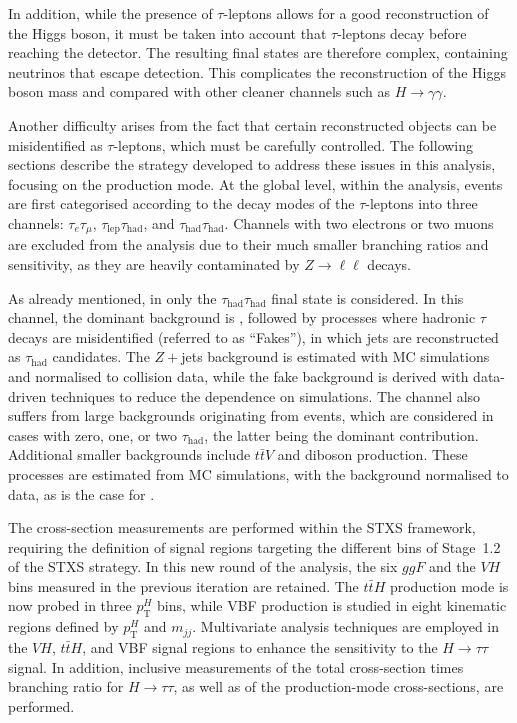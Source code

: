 In addition, while the presence of $\tau$-leptons allows for a good reconstruction of the Higgs boson, it must be taken into account that $\tau$-leptons decay before reaching the detector. The resulting final states are therefore complex, containing neutrinos that escape detection. This complicates the reconstruction of the Higgs boson mass and \pt compared with other cleaner channels such as $H \to \gamma\gamma$.  

Another difficulty arises from the fact that certain reconstructed objects can be misidentified as $\tau$-leptons, which must be carefully controlled. The following sections describe the strategy developed to address these issues in this analysis, focusing on the \ttH production mode. At the global level, within the \htautau analysis, events are first categorised according to the decay modes of the $\tau$-leptons into three channels: $\tau_{e}\tau_{\mu}$, $\tau_{\text{lep}}\tau_{\text{had}}$, and $\tau_{\text{had}}\tau_{\text{had}}$. Channels with two electrons or two muons are excluded from the analysis due to their much smaller branching ratios and sensitivity, as they are heavily contaminated by $Z \to \ell\ell$ decays.  

As already mentioned, in \ttHtt only the $\tau_{\text{had}}\tau_{\text{had}}$ final state is considered. In this channel, the dominant background is \ztautau, followed by processes where hadronic $\tau$ decays are misidentified (referred to as ``Fakes''), in which jets are reconstructed as $\tau_{\text{had}}$ candidates. The $Z+$jets background is estimated with MC simulations and normalised to collision data, while the fake background is derived with data-driven techniques to reduce the dependence on simulations. The \ttH channel also suffers from large backgrounds originating from \ttbar events, which are considered in cases with zero, one, or two $\tau_{\text{had}}$, the latter being the dominant contribution. Additional smaller backgrounds include $t\bar{t}V$ and diboson production. These processes are estimated from MC simulations, with the \ttbar background normalised to data, as is the case for \Ztautau.  

The cross-section measurements are performed within the STXS framework, requiring the definition of signal regions targeting the different bins of Stage~1.2 of the STXS strategy. In this new round of the \htautau analysis, the six $ggF$ and the $VH$ bins measured in the previous iteration are retained. The $t\bar{t}H$ production mode is now probed in three $p_{\text{T}}^H$ bins, while VBF production is studied in eight kinematic regions defined by $p_{\text{T}}^H$ and $m_{jj}$. Multivariate analysis techniques are employed in the $VH$, $t\bar{t}H$, and VBF signal regions to enhance the sensitivity to the $H \to \tau\tau$ signal. In addition, inclusive measurements of the total cross-section times branching ratio for $H \to \tau\tau$, as well as of the production-mode cross-sections, are performed.  

